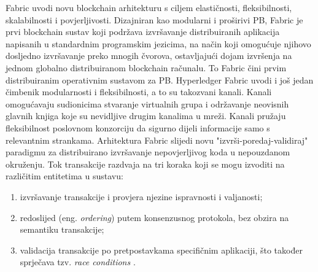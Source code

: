 \documentclass[times, utf8, diplomski]{fer}
\begin{document}
Fabric uvodi novu blockchain arhitekturu s ciljem elastičnosti, fleksibilnosti, skalabilnosti i povjerljivosti. Dizajniran kao modularni i proširivi PB, Fabric je prvi blockchain sustav koji podržava izvršavanje distribuiranih aplikacija napisanih u standardnim programskim jezicima, na način koji omogućuje njihovo dosljedno izvršavanje preko mnogih čvorova, ostavljajući dojam izvršenja na jednom globalno distribuiranom blockchain
računalu. To Fabric čini prvim distribuiranim operativnim sustavom za PB.
Hyperledger Fabric uvodi i još jedan čimbenik modularnosti i fleksibilnosti, a to su takozvani kanali. Kanali omogućavaju sudionicima stvaranje virtualnih grupa i održavanje neovisnih glavnih knjiga koje su nevidljive drugim kanalima u mreži. Kanali pružaju fleksibilnost poslovnom konzorciju da sigurno dijeli informacije samo s relevantnim strankama.
Arhitektura Fabric slijedi novu "izvrši-poredaj-validiraj" paradigmu za distribuirano izvršavanje nepovjerljivog koda u nepouzdanom okruženju. Tok transakcije razdvaja na tri koraka koji se mogu izvoditi na različitim entitetima u sustavu:

\begin{enumerate}

\item izvršavanje transakcije i provjera njezine ispravnosti i valjanosti;

\item redoslijed (eng.  \textit{ordering}) putem konsenzusnog protokola, bez obzira na semantiku transakcije;

\item validacija transakcije po pretpostavkama specifičnim aplikaciji, što također sprječava tzv.  \textit{race conditions} \cite{netzer1992race}.  

\end{enumerate}
\end{document}
